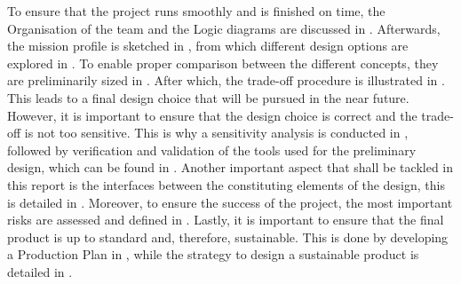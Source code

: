 To ensure that the project runs smoothly and is finished on time, the Organisation of the team and the Logic diagrams are discussed in .
Afterwards, the mission profile is sketched in , from which different design options are explored in .
To enable proper comparison between the different concepts, they are preliminarily sized in .
After which, the trade-off procedure is illustrated in .
This leads to a final design choice that will be pursued in the near future.
However, it is important to ensure that the design choice is correct and the trade-off is not too sensitive.
This is why a sensitivity analysis is conducted in , followed by verification and validation of the tools used for the preliminary design, which can be found in .
Another important aspect that shall be tackled in this report is the interfaces between the constituting elements of the design, this is detailed in .
Moreover, to ensure the success of the project, the most important risks are assessed and defined in .
Lastly, it is important to ensure that the final product is up to standard and, therefore, sustainable.
This is done by developing a Production Plan in , while the strategy to design a sustainable product is detailed in .